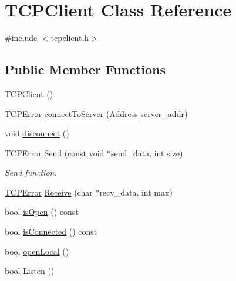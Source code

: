 \hypertarget{classTCPClient}{\section{T\-C\-P\-Client Class Reference}
\label{classTCPClient}
}


{\ttfamily \#include $<$tcpclient.\-h$>$}

\subsection*{Public Member Functions}
\begin{DoxyCompactItemize}
\item 
\hyperlink{classTCPClient_ad37bba4f2ebcc899b9871656802dcbe9}{T\-C\-P\-Client} ()
\item 
\hyperlink{tcpclient_8h_ab36b81f0daebbad95a533ea9951ee569}{T\-C\-P\-Error} \hyperlink{classTCPClient_adb1706d816b7810d28ef9eeab77a423b}{connect\-To\-Server} (\hyperlink{classAddress}{Address} server\-\_\-addr)
\item 
void \hyperlink{classTCPClient_aeef43b15ef57aefead37ff7300ebc779}{disconnect} ()
\item 
\hyperlink{tcpclient_8h_ab36b81f0daebbad95a533ea9951ee569}{T\-C\-P\-Error} \hyperlink{classTCPClient_a23a640eac58e631288cdeb479416e0ed}{Send} (const void $\ast$send\-\_\-data, int size)
\begin{DoxyCompactList}\small\item\em Send function. \end{DoxyCompactList}\item 
\hyperlink{tcpclient_8h_ab36b81f0daebbad95a533ea9951ee569}{T\-C\-P\-Error} \hyperlink{classTCPClient_aa070f44fa48f948931b2c49e31b5a149}{Receive} (char $\ast$recv\-\_\-data, int max)
\item 
bool \hyperlink{classTCPClient_a8c1298fab750438558a6d1e13afc3217}{is\-Open} () const 
\item 
bool \hyperlink{classTCPClient_a30054a07061dfe22e7a9a7783a843bcc}{is\-Connected} () const 
\item 
bool \hyperlink{classTCPClient_a8043d706038dd8d4aebe3c8898aa1a5b}{open\-Local} ()
\item 
bool \hyperlink{classTCPClient_a3daf1addf9f9b21c05aeae58c443476a}{Listen} ()
\end{DoxyCompactItemize}


